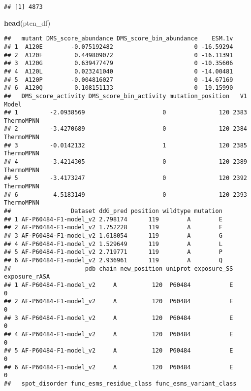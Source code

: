 \documentclass[
]{article}
\newenvironment{Shaded}{\begin{snugshade}}{\end{snugshade}}
\newcommand{\FunctionTok}[1]{\textcolor[rgb]{0.13,0.29,0.53}{\textbf{#1}}}
\newcommand{\NormalTok}[1]{#1}
\begin{document}
\begin{verbatim}
## [1] 4873
\end{verbatim}

\begin{Shaded}
\begin{Highlighting}[]
\FunctionTok{head}\NormalTok{(pten\_df)}
\end{Highlighting}
\end{Shaded}

\begin{verbatim}
##   mutant DMS_score_abundance DMS_score_bin_abundance    ESM.1v
## 1  A120E        -0.075192482                       0 -16.59294
## 2  A120F         0.449809072                       0 -16.11391
## 3  A120G         0.639477479                       0 -10.35606
## 4  A120L         0.023241040                       0 -14.00481
## 5  A120P        -0.004816027                       0 -14.67169
## 6  A120Q         0.108151133                       0 -19.15990
##   DMS_score_activity DMS_score_bin_activity mutation_position   V1      Model
## 1         -2.0938569                      0               120 2383 ThermoMPNN
## 2         -3.4270689                      0               120 2384 ThermoMPNN
## 3         -0.0142132                      1               120 2385 ThermoMPNN
## 4         -3.4214305                      0               120 2389 ThermoMPNN
## 5         -3.4173247                      0               120 2392 ThermoMPNN
## 6         -4.5183149                      0               120 2393 ThermoMPNN
##                 Dataset ddG_pred position wildtype mutation
## 1 AF-P60484-F1-model_v2 2.798174      119        A        E
## 2 AF-P60484-F1-model_v2 1.752228      119        A        F
## 3 AF-P60484-F1-model_v2 1.618054      119        A        G
## 4 AF-P60484-F1-model_v2 1.529649      119        A        L
## 5 AF-P60484-F1-model_v2 2.719771      119        A        P
## 6 AF-P60484-F1-model_v2 2.936961      119        A        Q
##                     pdb chain new_position uniprot exposure_SS exposure_rASA
## 1 AF-P60484-F1-model_v2     A          120  P60484           E             0
## 2 AF-P60484-F1-model_v2     A          120  P60484           E             0
## 3 AF-P60484-F1-model_v2     A          120  P60484           E             0
## 4 AF-P60484-F1-model_v2     A          120  P60484           E             0
## 5 AF-P60484-F1-model_v2     A          120  P60484           E             0
## 6 AF-P60484-F1-model_v2     A          120  P60484           E             0
##   spot_disorder func_esms_residue_class func_esms_variant_class

\end{verbatim}
\end{document}
